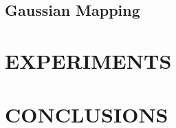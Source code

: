 \documentclass[letterpaper, 10 pt, conference]{ieeeconf}  %
\begin{document}
\subsection{Gaussian Mapping}

\section{EXPERIMENTS}

\section{CONCLUSIONS}











\end{document}
